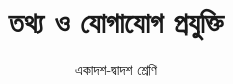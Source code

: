 \documentclass[10pt, twoside, openany]{book}
\begin{document}
\frontmatter
\title{তথ্য ও যোগাযোগ প্রযুক্তি}
\author{একাদশ-দ্বাদশ শ্রেণি}
\maketitle

\renewcommand{\contentsname}{সূচিপত্র}
\tableofcontents
\mainmatter







\end{document}
